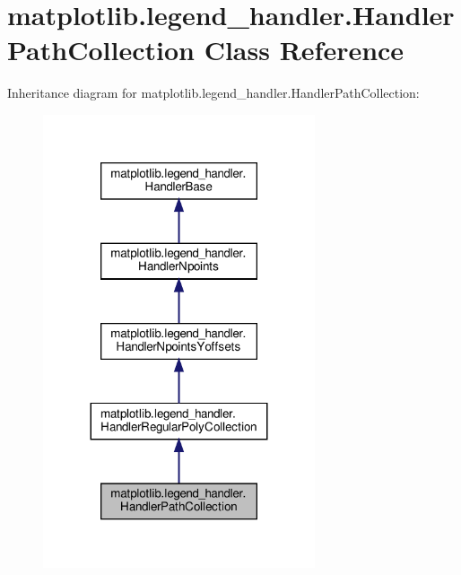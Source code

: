 \hypertarget{classmatplotlib_1_1legend__handler_1_1HandlerPathCollection}{}\section{matplotlib.\+legend\+\_\+handler.\+Handler\+Path\+Collection Class Reference}
\label{classmatplotlib_1_1legend__handler_1_1HandlerPathCollection}


Inheritance diagram for matplotlib.\+legend\+\_\+handler.\+Handler\+Path\+Collection\+:
\nopagebreak
\begin{figure}[H]
\begin{center}
\leavevmode
\includegraphics[width=227pt]{classmatplotlib_1_1legend__handler_1_1HandlerPathCollection__inherit__graph}
\end{center}
\end{figure}


